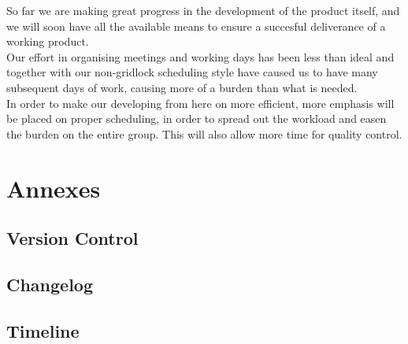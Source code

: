 \documentclass[12pt,a4paper]{article}
\begin{document}
So far we are making great progress in the development of the product itself, and we will soon have all the available means to ensure a succesful deliverance of a working product.\\
Our effort in organising meetings and working days has been less than ideal and together with our non-gridlock scheduling style have caused us to have many subsequent days of work, causing more of a burden than what is needed.\\
In order to make our developing from here on more efficient, more emphasis will be placed on proper scheduling, in order to spread out the workload and easen the burden on the entire group. This will also allow more time for quality control.

\newpage
\section{Annexes}
\subsection{Version Control}
\subsection{Changelog}
\subsection{Timeline}
\end{document}
